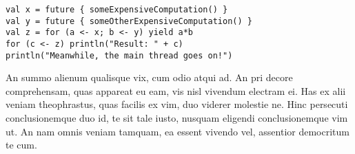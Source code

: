 \documentclass[11pt,article,oneside]{memoir}
\begin{document}
\begin{verbatim}
val x = future { someExpensiveComputation() }
val y = future { someOtherExpensiveComputation() }
val z = for (a <- x; b <- y) yield a*b
for (c <- z) println("Result: " + c)
println("Meanwhile, the main thread goes on!")
\end{verbatim}

An summo alienum qualisque vix, cum odio atqui ad. An pri decore comprehensam,
quas appareat eu eam, vis nisl vivendum electram ei. Has ex alii veniam
theophrastus, quas facilis ex vim, duo viderer molestie ne. Hinc persecuti
conclusionemque duo id, te sit tale iusto, nusquam eligendi conclusionemque vim
ut. An nam omnis veniam tamquam, ea essent vivendo vel, assentior democritum te
cum.



\printbibliography
\end{document}
